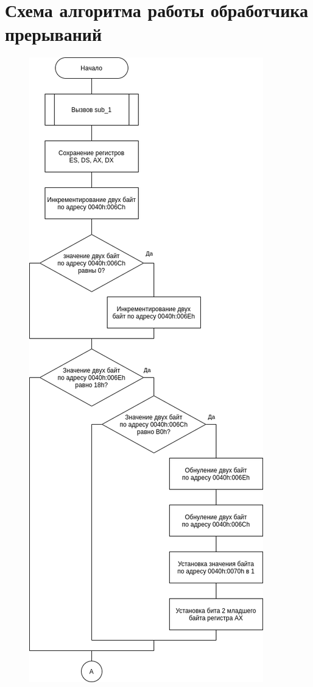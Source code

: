 \chapter{Схема алгоритма работы обработчика прерываний}

\begin{figure}
	\centering
	\includegraphics[height=1.1\linewidth]{../int8h_1.png}
\end{figure}

